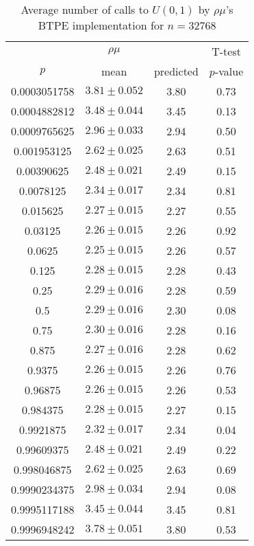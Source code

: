 \begin{table}[t]
\caption{Average number of calls to $U(0,1)$ by $\rho\mu$'s BTPE implementation for $n=32768$}
\label{tab:calls32768}
\begin{tabular}{cccc} \hline
    & $\rho\mu$ & & T-test \\
$p$ & mean & predicted & $p$-value \\ \hline
0.0003051758 & $3.81 \pm 0.052$ & 3.80 & 0.73 \\
0.0004882812 & $3.48 \pm 0.044$ & 3.45 & 0.13 \\
0.0009765625 & $2.96 \pm 0.033$ & 2.94 & 0.50 \\
0.001953125  & $2.62 \pm 0.025$ & 2.63 & 0.51 \\
0.00390625   & $2.48 \pm 0.021$ & 2.49 & 0.15 \\
0.0078125    & $2.34 \pm 0.017$ & 2.34 & 0.81 \\
0.015625     & $2.27 \pm 0.015$ & 2.27 & 0.55 \\
0.03125      & $2.26 \pm 0.015$ & 2.26 & 0.92 \\
0.0625       & $2.25 \pm 0.015$ & 2.26 & 0.57 \\
0.125        & $2.28 \pm 0.015$ & 2.28 & 0.43 \\
0.25         & $2.29 \pm 0.016$ & 2.28 & 0.59 \\
0.5          & $2.29 \pm 0.016$ & 2.30 & 0.08 \\
0.75         & $2.30 \pm 0.016$ & 2.28 & 0.16 \\
0.875        & $2.27 \pm 0.016$ & 2.28 & 0.62 \\
0.9375       & $2.26 \pm 0.015$ & 2.26 & 0.76 \\
0.96875      & $2.26 \pm 0.015$ & 2.26 & 0.53 \\
0.984375     & $2.28 \pm 0.015$ & 2.27 & 0.15 \\
0.9921875    & $2.32 \pm 0.017$ & 2.34 & 0.04 \\
0.99609375   & $2.48 \pm 0.021$ & 2.49 & 0.22 \\
0.998046875  & $2.62 \pm 0.025$ & 2.63 & 0.69 \\
0.9990234375 & $2.98 \pm 0.034$ & 2.94 & 0.08 \\
0.9995117188 & $3.45 \pm 0.044$ & 3.45 & 0.81 \\
0.9996948242 & $3.78 \pm 0.051$ & 3.80 & 0.53 \\
\hline
\end{tabular}
\end{table}

